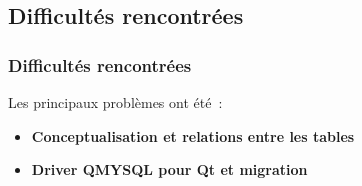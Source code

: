 \subsection{Difficultés rencontrées}
\begin{frame}
\frametitle{Difficultés rencontrées}
Les principaux problèmes ont été~:
\begin{itemize}
\item<2-> \textbf{Conceptualisation et relations entre les tables}
\item<3-> \textbf{Driver QMYSQL pour Qt et migration}
\end{itemize}
\end{frame}
